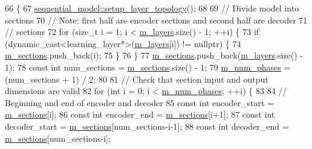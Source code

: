 \begin{DoxyCode}
66                                                         \{
67   \hyperlink{classlbann_1_1sequential__model_a3801a58530388fb6a8cb3e1c018e827d}{sequential\_model::setup\_layer\_topology}();
68 
69   \textcolor{comment}{// Divide model into sections}
70   \textcolor{comment}{// Note: first half are encoder sections and second half are decoder}
71   \textcolor{comment}{// sections}
72   \textcolor{keywordflow}{for} (\textcolor{keywordtype}{size\_t} i = 1; i < \hyperlink{classlbann_1_1model_a0229fc226ec163d1411548446104569d}{m\_layers}.size() - 1; ++i) \{
73     \textcolor{keywordflow}{if} (dynamic\_cast<learning\_layer*>(\hyperlink{classlbann_1_1model_a0229fc226ec163d1411548446104569d}{m\_layers}[i]) != \textcolor{keyword}{nullptr}) \{
74       \hyperlink{classlbann_1_1greedy__layerwise__autoencoder_aacb3dbf01c38f46a32927722420c5d41}{m\_sections}.push\_back(i);
75     \}
76   \}
77   \hyperlink{classlbann_1_1greedy__layerwise__autoencoder_aacb3dbf01c38f46a32927722420c5d41}{m\_sections}.push\_back(\hyperlink{classlbann_1_1model_a0229fc226ec163d1411548446104569d}{m\_layers}.size() - 1);
78   \textcolor{keyword}{const} \textcolor{keywordtype}{int} num\_sections = \hyperlink{classlbann_1_1greedy__layerwise__autoencoder_aacb3dbf01c38f46a32927722420c5d41}{m\_sections}.size() - 1;
79   \hyperlink{classlbann_1_1greedy__layerwise__autoencoder_a792010a00136ee1e024b6e5d38c77386}{m\_num\_phases} = (num\_sections + 1) / 2;
80 
81   \textcolor{comment}{// Check that section input and output dimensions are valid}
82   \textcolor{keywordflow}{for} (\textcolor{keywordtype}{int} i = 0; i < \hyperlink{classlbann_1_1greedy__layerwise__autoencoder_a792010a00136ee1e024b6e5d38c77386}{m\_num\_phases}; ++i) \{
83 
84     \textcolor{comment}{// Beginning and end of encoder and decoder}
85     \textcolor{keyword}{const} \textcolor{keywordtype}{int} encoder\_start = \hyperlink{classlbann_1_1greedy__layerwise__autoencoder_aacb3dbf01c38f46a32927722420c5d41}{m\_sections}[i];
86     \textcolor{keyword}{const} \textcolor{keywordtype}{int} encoder\_end = \hyperlink{classlbann_1_1greedy__layerwise__autoencoder_aacb3dbf01c38f46a32927722420c5d41}{m\_sections}[i+1];
87     \textcolor{keyword}{const} \textcolor{keywordtype}{int} decoder\_start = \hyperlink{classlbann_1_1greedy__layerwise__autoencoder_aacb3dbf01c38f46a32927722420c5d41}{m\_sections}[num\_sections-i-1];
88     \textcolor{keyword}{const} \textcolor{keywordtype}{int} decoder\_end = \hyperlink{classlbann_1_1greedy__layerwise__autoencoder_aacb3dbf01c38f46a32927722420c5d41}{m\_sections}[num\_sections-i];

\end{DoxyCode}
